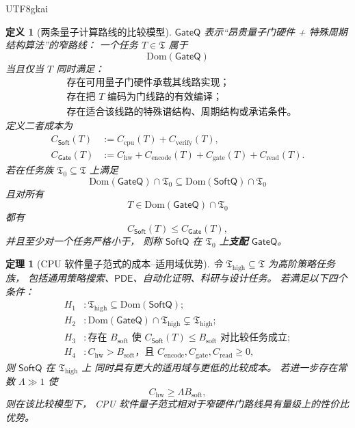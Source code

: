 \documentclass[12pt]{article}
\newtheorem{definition}{定义}[section]
\newtheorem{theorem}{定理}[section]
\newcommand{\PDE}{\mathsf{PDE}}
\begin{document}
\begin{CJK*}{UTF8}{gkai}
\begin{definition}[两条量子计算路线的比较模型]
\(\mathsf{GateQ}\) 表示“昂贵量子门硬件 + 特殊周期结构算法”的窄路线：
一个任务 \(T\in\mathfrak T\) 属于
\[
  \mathrm{Dom}(\mathsf{GateQ})
\]
当且仅当 \(T\) 同时满足：
\[
\begin{aligned}
  &\text{存在可用量子门硬件承载其线路实现；}\\
  &\text{存在把 }T\text{ 编码为门线路的有效编译；}\\
  &\text{存在适合该线路的特殊谱结构、周期结构或承诺条件。}
\end{aligned}
\]
定义二者成本为
\[
\begin{aligned}
  C_{\mathsf{Soft}}(T)
  &:=
  C_{\mathrm{cpu}}(T)+C_{\mathrm{verify}}(T),\\
  C_{\mathsf{Gate}}(T)
  &:=
  C_{\mathrm{hw}}+
  C_{\mathrm{encode}}(T)+
  C_{\mathrm{gate}}(T)+
  C_{\mathrm{read}}(T).
\end{aligned}
\]
若在任务族 \(\mathfrak T_0\subseteq\mathfrak T\) 上满足
\[
  \mathrm{Dom}(\mathsf{GateQ})\cap\mathfrak T_0
  \subseteq
  \mathrm{Dom}(\mathsf{SoftQ})\cap\mathfrak T_0
\]
且对所有
\[
  T\in \mathrm{Dom}(\mathsf{GateQ})\cap\mathfrak T_0
\]
都有
\[
  C_{\mathsf{Soft}}(T)\le C_{\mathsf{Gate}}(T),
\]
并且至少对一个任务严格小于，
则称 \(\mathsf{SoftQ}\) 在 \(\mathfrak T_0\) 上\textbf{支配}
\(\mathsf{GateQ}\)。
\end{definition}

\begin{theorem}[CPU 软件量子范式的成本--适用域优势]
\label{thm:tex53-cpu-cost-domain-advantage}
令 \(\mathfrak T_{\mathrm{high}}\subseteq\mathfrak T\)
为高阶策略任务族，
包括通用策略搜索、\(\PDE\)、自动化证明、科研与设计任务。
若满足以下四个条件：
\[
\begin{aligned}
  H_1 &: \mathfrak T_{\mathrm{high}}
  \subseteq
  \mathrm{Dom}(\mathsf{SoftQ});\\
  H_2 &: \mathrm{Dom}(\mathsf{GateQ})\cap\mathfrak T_{\mathrm{high}}
  \subsetneq
  \mathfrak T_{\mathrm{high}};\\
  H_3 &: \text{存在 }B_{\mathrm{soft}}\text{ 使 }
  C_{\mathsf{Soft}}(T)\le B_{\mathrm{soft}}
  \text{ 对比较任务成立};\\
  H_4 &: C_{\mathrm{hw}}
  >
  B_{\mathrm{soft}}
  \text{，且 }
  C_{\mathrm{encode}},C_{\mathrm{gate}},C_{\mathrm{read}}\ge0,
\end{aligned}
\]
则 \(\mathsf{SoftQ}\) 在 \(\mathfrak T_{\mathrm{high}}\) 上
同时具有更大的适用域与更低的比较成本。
若进一步存在常数 \(\Lambda\gg1\) 使
\[
  C_{\mathrm{hw}}\ge \Lambda B_{\mathrm{soft}},
\]
则在该比较模型下，
CPU 软件量子范式相对于窄硬件门路线具有量级上的性价比优势。
\end{theorem}


\end{CJK*}
\end{document}
